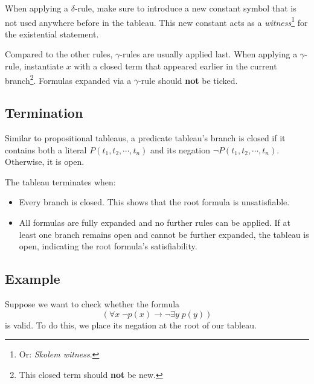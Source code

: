 When applying a \(\delta\)-rule, make sure to introduce a new constant symbol that is not used anywhere before in the tableau. This new constant acts as a \emph{witness}\footnote{Or: \emph{Skolem witness}.} for the existential statement.

Compared to the other rules, \(\gamma\)-rules are usually applied last. When applying a \(\gamma\)-rule, instantiate \(x\) with a closed term that appeared earlier in the current branch\footnote{This closed term should \textbf{not} be new.}. Formulas expanded via a \(\gamma\)-rule should \textbf{not} be ticked.



\subsection{Termination}

Similar to propositional tableaus, a predicate tableau's branch is closed if it contains both a literal \(P(t_1, t_2, \cdots, t_n)\) and its negation \(\neg P(t_1, t_2, \cdots, t_n)\). Otherwise, it is open.

The tableau terminates when:
%
\begin{itemize}
    \item Every branch is closed. This shows that the root formula is unsatisfiable.
    \item All formulas are fully expanded and no further rules can be applied. If at least one branch remains open and cannot be further expanded, the tableau is open, indicating the root formula's satisfiability.
\end{itemize}




\subsection{Example}

Suppose we want to check whether the formula
%
\[(\forall x\; \neg p(x) \rightarrow \neg\exists y\; p(y))\]
%
is valid. To do this, we place its negation at the root of our tableau.


